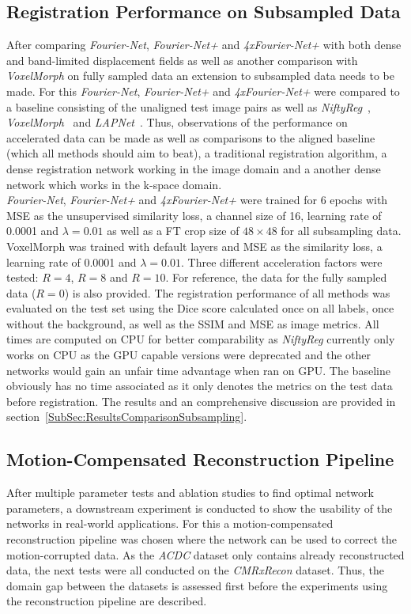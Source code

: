 \subsection{Registration Performance on Subsampled Data} \label{SubSubSec:ComparisonSubsampling}
After comparing \emph{Fourier-Net}, \emph{Fourier-Net+} and \emph{4xFourier-Net+} with both dense and band-limited displacement fields as well as another comparison with \emph{VoxelMorph} on fully sampled data 
an extension to subsampled data needs to be made. For this \emph{Fourier-Net}, \emph{Fourier-Net+} and \emph{4xFourier-Net+} were compared to a baseline consisting of the unaligned test image pairs as well as \emph{NiftyReg}~\cite{NiftiReg}, \emph{VoxelMorph}~\cite{Voxelmorph} and \emph{LAPNet}~\cite{LAPNet}. Thus, observations of the performance on accelerated data can be made as well as comparisons to the aligned baseline (which all methods should aim to beat), a traditional registration algorithm, a dense registration network working in the image domain and a another dense network which works in the k-space domain.\\
\emph{Fourier-Net}, \emph{Fourier-Net+} and \emph{4xFourier-Net+} were trained for 6 epochs with MSE as the unsupervised similarity loss, a channel size of 16, learning rate of 0.0001 and $\lambda=0.01$ as well as a FT crop size of $48 \times 48$ for all subsampling data. VoxelMorph was trained with default layers and MSE as the similarity loss, a learning rate of 0.0001 and $\lambda=0.01$. Three different acceleration factors were tested: $R=4$, $R=8$ and $R=10$. For reference, the data for the fully sampled data ($R=0$) is also provided. The registration performance of all methods was evaluated on the test set using the Dice score calculated once on all labels, once without the background, as well as the SSIM and MSE as image metrics. All times are computed on CPU for better comparability as \emph{NiftyReg} currently only works on CPU as the GPU capable versions were deprecated and the other networks would gain an unfair time advantage when ran on GPU. The baseline obviously has no time associated as it only denotes the metrics on the test data before registration. The results and an comprehensive discussion are provided in section~\ref{SubSec:ResultsComparisonSubsampling}.


\subsection{Motion-Compensated Reconstruction Pipeline} \label{SubSec:IntegrationMotion-CompensatedReconstructionPipeline}
After multiple parameter tests and ablation studies to find optimal network parameters, a downstream experiment is conducted to show the usability of the networks in real-world applications. For this a motion-compensated reconstruction pipeline was chosen where the network can be used to correct the motion-corrupted data. As the \emph{ACDC} dataset only contains already reconstructed data, the next tests were all conducted on the \emph{CMRxRecon} dataset. Thus, the domain gap between the datasets is assessed first before the experiments using the reconstruction pipeline are described.

